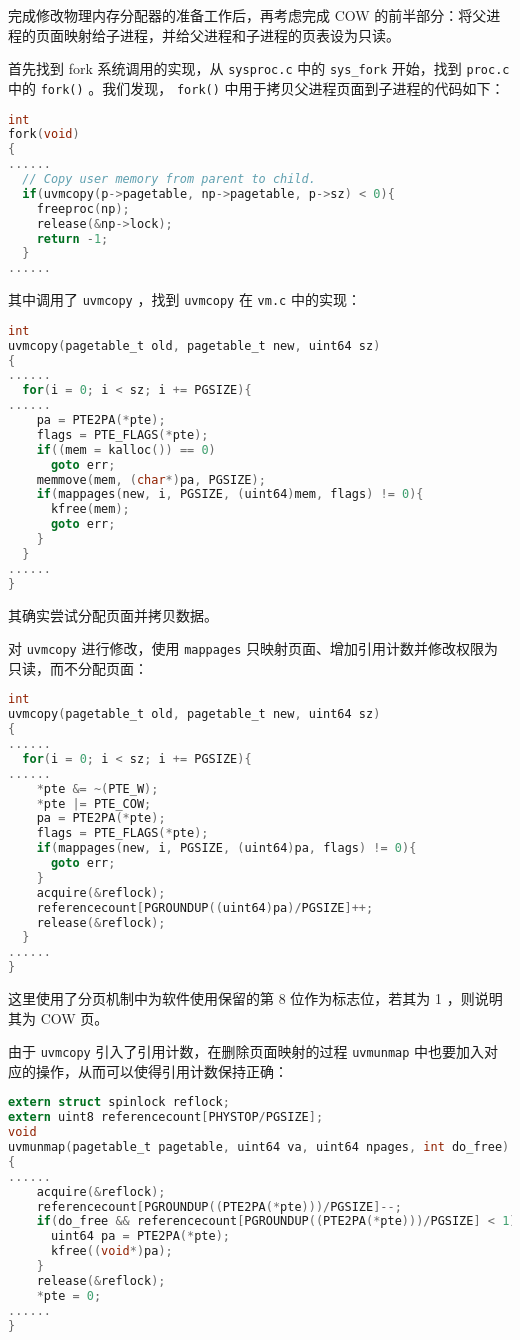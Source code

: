 完成修改物理内存分配器的准备工作后，再考虑完成 COW 的前半部分：将父进程的页面映射给子进程，并给父进程和子进程的页表设为只读。

首先找到 fork 系统调用的实现，从 \lstinline{sysproc.c} 中的 \lstinline{sys_fork} 开始，找到 \lstinline{proc.c} 中的 \lstinline{fork()} 。我们发现， \lstinline{fork()} 中用于拷贝父进程页面到子进程的代码如下：
\begin{lstlisting}[language=C]
int
fork(void)
{
......
  // Copy user memory from parent to child.
  if(uvmcopy(p->pagetable, np->pagetable, p->sz) < 0){
    freeproc(np);
    release(&np->lock);
    return -1;
  }
......
\end{lstlisting}

其中调用了 \lstinline{uvmcopy} ，找到 \lstinline{uvmcopy} 在 \lstinline{vm.c} 中的实现：
\begin{lstlisting}[language=C]
int
uvmcopy(pagetable_t old, pagetable_t new, uint64 sz)
{
......
  for(i = 0; i < sz; i += PGSIZE){
......
    pa = PTE2PA(*pte);
    flags = PTE_FLAGS(*pte);
    if((mem = kalloc()) == 0)
      goto err;
    memmove(mem, (char*)pa, PGSIZE);
    if(mappages(new, i, PGSIZE, (uint64)mem, flags) != 0){
      kfree(mem);
      goto err;
    }
  }
......
}
\end{lstlisting}

其确实尝试分配页面并拷贝数据。

对 \lstinline{uvmcopy} 进行修改，使用 \lstinline{mappages} 只映射页面、增加引用计数并修改权限为只读，而不分配页面：
\begin{lstlisting}[language=C]
int
uvmcopy(pagetable_t old, pagetable_t new, uint64 sz)
{
......
  for(i = 0; i < sz; i += PGSIZE){
......
    *pte &= ~(PTE_W);
    *pte |= PTE_COW;
    pa = PTE2PA(*pte);
    flags = PTE_FLAGS(*pte);
    if(mappages(new, i, PGSIZE, (uint64)pa, flags) != 0){
      goto err;
    }
    acquire(&reflock);
    referencecount[PGROUNDUP((uint64)pa)/PGSIZE]++;
    release(&reflock);
  }
......
}
\end{lstlisting}
这里使用了分页机制中为软件使用保留的第 8 位作为标志位，若其为 1 ，则说明其为 COW 页。

由于 \lstinline{uvmcopy} 引入了引用计数，在删除页面映射的过程 \lstinline{uvmunmap} 中也要加入对应的操作，从而可以使得引用计数保持正确：
\begin{lstlisting}[language=C]
extern struct spinlock reflock;
extern uint8 referencecount[PHYSTOP/PGSIZE];
void
uvmunmap(pagetable_t pagetable, uint64 va, uint64 npages, int do_free)
{
......
    acquire(&reflock);
    referencecount[PGROUNDUP((PTE2PA(*pte)))/PGSIZE]--;
    if(do_free && referencecount[PGROUNDUP((PTE2PA(*pte)))/PGSIZE] < 1){
      uint64 pa = PTE2PA(*pte);
      kfree((void*)pa);
    }
    release(&reflock);
    *pte = 0;
......
}
\end{lstlisting}

